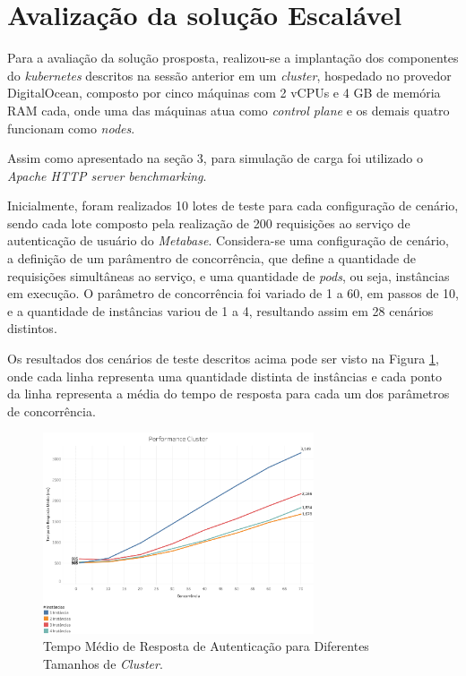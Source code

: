\section{Avalização da solução Escalável}

Para a avaliação da solução prosposta, realizou-se a implantação dos componentes do \textit{kubernetes} descritos na sessão anterior em um \textit{cluster}, hospedado no provedor DigitalOcean, composto por cinco máquinas com 2 vCPUs e 4 GB de memória RAM cada, onde uma das máquinas atua como \textit{control plane} e os demais quatro funcionam como \textit{nodes}.

Assim como apresentado na seção 3, para simulação de carga foi utilizado o \textit{Apache HTTP server benchmarking}. 

Inicialmente, foram realizados 10 lotes de teste para cada configuração de cenário, sendo cada lote composto pela realização de 200 requisições ao serviço de autenticação de usuário do \textit{Metabase}. Considera-se uma configuração de cenário, a definição de um parâmentro de concorrência, que define a quantidade de requisições simultâneas ao serviço, e uma quantidade de \textit{pods}, ou seja, instâncias em execução. O parâmetro de concorrência foi variado de 1 a 60, em passos de 10, e a quantidade de instâncias variou de 1 a 4, resultando assim em 28 cenários distintos.

Os resultados dos cenários de teste descritos acima pode ser visto na Figura \ref{fig.avg-resp-time-cluster}, onde cada linha representa uma quantidade distinta de instâncias e cada ponto da linha representa a média do tempo de resposta para cada um dos parâmetros de concorrência.

\begin{figure}[htp]
   \centering
    \includegraphics[width=8cm]{Imagens/Performance-Cluster}
    \caption{Tempo Médio de Resposta de Autenticação para Diferentes Tamanhos de \textit{Cluster}.}
    \label{fig.avg-resp-time-cluster}
\end{figure} 

